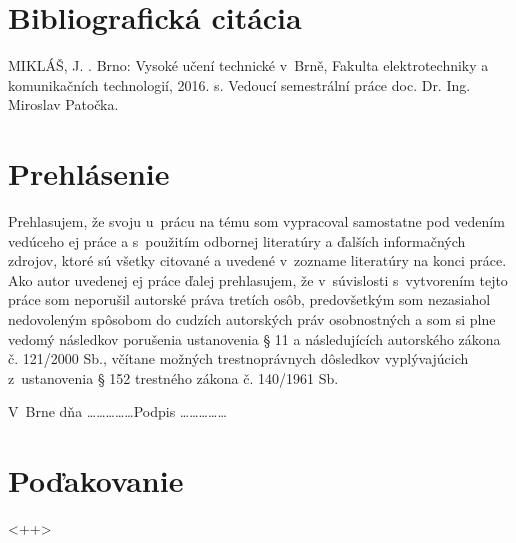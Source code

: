\newpage
\thispagestyle{empty}
\section*{Bibliografická citácia}
MIKLÁŠ, J. \nazov. Brno: Vysoké učení technické v~Brně, Fakulta elektrotechniky a komunikačních technologií, 2016. \pageref{LastPage} s. Vedoucí semestrální práce doc. Dr. Ing. Miroslav Patočka.

\newpage
\thispagestyle{empty}
\section*{Prehlásenie}

Prehlasujem, že svoju \typprace u~prácu na tému \nazov som vypracoval samostatne pod vedením vedúceho \typprace ej práce a s~použitím odbornej literatúry a ďalších informačných zdrojov, ktoré sú všetky citované a uvedené v~zozname literatúry na konci práce.
Ako autor uvedenej \typprace ej práce ďalej prehlasujem, že v~súvislosti s~vytvorením tejto práce som neporušil autorské práva tretích osôb, predovšetkým som nezasiahol nedovoleným spôsobom do cudzích autorských práv osobnostných a som si plne vedomý následkov porušenia ustanovenia § 11 a následujících autorského zákona č. 121/2000 Sb., včítane  možných
trestnoprávnych dôsledkov vyplývajúcich z~ustanovenia § 152 trestného zákona č. 140/1961 Sb.

\vspace{2cm}
V~Brne dňa \ldots\ldots\ldots\ldots\ldots \hspace{30mm}Podpis \ldots\ldots\ldots\ldots\ldots
\vspace{5cm}



\section*{Poďakovanie}
<++>

